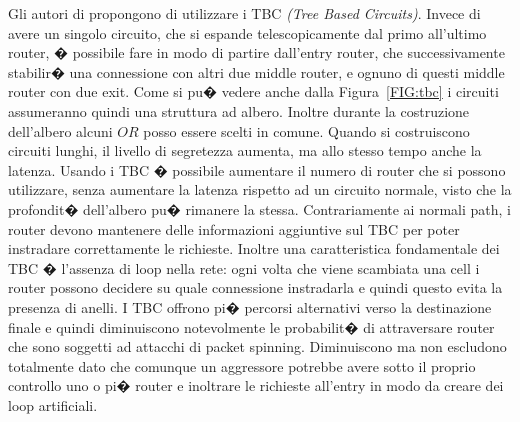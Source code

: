 Gli autori di \cite{packetspinning} propongono di utilizzare i TBC \emph{(Tree Based Circuits)}. Invece di avere un singolo circuito, che si espande telescopicamente dal primo all'ultimo router, � possibile fare in modo di partire dall'entry router, che successivamente stabilir� una connessione con altri due middle router, e ognuno di questi middle router con due exit. Come si pu� vedere anche dalla Figura~\ref{FIG:tbc} i circuiti assumeranno quindi una struttura ad albero. Inoltre durante la costruzione dell'albero alcuni $OR$ posso essere scelti in comune.
Quando si costruiscono circuiti lunghi, il livello di segretezza aumenta, ma allo stesso tempo anche la latenza. Usando i TBC � possibile aumentare il numero di router che si possono utilizzare, senza aumentare la latenza rispetto ad un circuito normale, visto che la profondit� dell'albero pu� rimanere la stessa. Contrariamente ai normali path, i router devono mantenere delle informazioni aggiuntive sul TBC per poter instradare correttamente le richieste. Inoltre una caratteristica fondamentale dei TBC � l'assenza di loop nella rete: ogni volta che viene scambiata una cell i router possono decidere su quale connessione instradarla e quindi questo evita la presenza di anelli. I TBC offrono pi� percorsi alternativi verso la destinazione finale e quindi diminuiscono notevolmente le probabilit� di attraversare router che sono soggetti ad attacchi di packet spinning. Diminuiscono ma non escludono totalmente dato che comunque un aggressore potrebbe avere sotto il proprio controllo uno o pi� router e inoltrare le richieste all'entry in modo da creare dei loop artificiali. 
